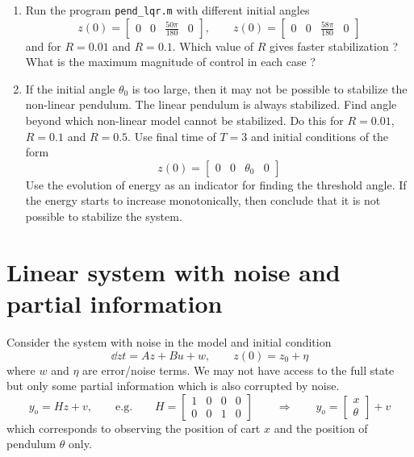 \documentclass[12pt]{article}
\begin{document}
\begin{enumerate}
\item Run the program {\tt pend\_lqr.m} with different initial angles
\[
z(0) = \begin{bmatrix}
0 & 0 & \frac{50 \pi}{180} & 0 
\end{bmatrix}, \qquad z(0) = \begin{bmatrix}
0 & 0 & \frac{58 \pi}{180} & 0 
\end{bmatrix}
\]
and for $R=0.01$ and $R=0.1$. Which value of $R$ gives faster stabilization ? What is the maximum magnitude of control in each case ? 

\item If the initial angle $\theta_0$ is too large, then it may not be possible to stabilize the non-linear pendulum. The linear pendulum is always stabilized. Find angle beyond which non-linear model cannot be stabilized. Do this for $R=0.01$, $R=0.1$ and $R=0.5$. Use final time of $T=3$ and initial conditions of the form 
\[
z(0) = \begin{bmatrix}
0 & 0 & \theta_0 & 0 
\end{bmatrix}
\]
Use the evolution of energy as an indicator for finding the threshold angle. If the energy starts to increase monotonically, then conclude that it is not possible to stabilize the system.

\end{enumerate}

\section{Linear system with noise and partial information}
Consider the system with noise in the model and initial condition
\[
\dd{z}{t} = Az + Bu + w, \qquad z(0) = z_0 + \eta
\]
where $w$ and $\eta$ are error/noise terms. We may not have access to the full state but only some partial information which is also corrupted by noise.
\[
y_o = Hz  + v, \qquad \textrm{e.g.} \qquad H = \begin{bmatrix}
1 & 0 & 0 & 0 \\
0 & 0 & 1 & 0 \end{bmatrix} \qquad \Longrightarrow \qquad y_o = \begin{bmatrix}
x \\ \theta \end{bmatrix} + v
\]
which corresponds to observing the position of cart $x$ and the position of pendulum $\theta$ only.

\vspace{5mm}
\end{document}
